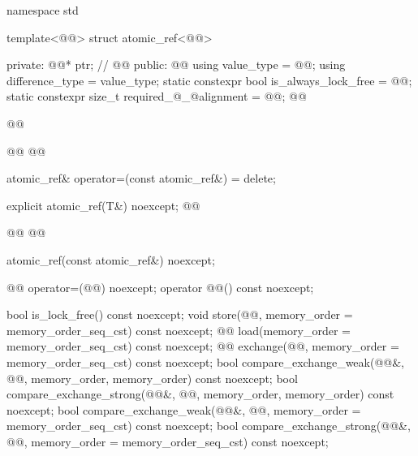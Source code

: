 \begin{codeblock}
namespace std {
  template<@@> struct atomic_ref<@@> {
  private:
    @@* ptr; // \expos
    @@
  public:
    @@
    using value_type = @@;
    using difference_type = value_type;
    static constexpr bool is_always_lock_free = @@;
    static constexpr size_t required_@_@alignment = @@;
    @@
    
    @@

    @@
    @@

    atomic_ref& operator=(const atomic_ref&) = delete;

    explicit atomic_ref(T&) noexcept;
    @@
    
    @@
    @@
    
    atomic_ref(const atomic_ref&) noexcept;

    @@ operator=(@@) noexcept;
    operator @@() const noexcept;

    bool is_lock_free() const noexcept;
    void store(@@, memory_order = memory_order_seq_cst) const noexcept;
    @@ load(memory_order = memory_order_seq_cst) const noexcept;
    @@ exchange(@@,
                            memory_order = memory_order_seq_cst) const noexcept;
    bool compare_exchange_weak(@@&, @@,
                               memory_order, memory_order) const noexcept;
    bool compare_exchange_strong(@@&, @@,
                                 memory_order, memory_order) const noexcept;
    bool compare_exchange_weak(@@&, @@,
                               memory_order = memory_order_seq_cst) const noexcept;
    bool compare_exchange_strong(@@&, @@,
                                 memory_order = memory_order_seq_cst) const noexcept;

}}
\end{codeblock}

